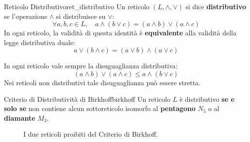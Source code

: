 \begin{definizione}{Reticolo Distributivo}{ret_distributivo}
Un reticolo $(L, \wedge, \vee)$ si dice \textbf{distributivo} se l'operazione $\wedge$ si distribuisce su $\vee$:
\[
    \forall a, b, c \in L, \quad a \wedge (b \vee c) = (a \wedge b) \vee (a \wedge c)
\]
In ogni reticolo, la validità di questa identità è \textbf{equivalente} alla validità della legge distributiva duale:
\[
    a \vee (b \wedge c) = (a \vee b) \wedge (a \vee c)
\]
\end{definizione}

In ogni reticolo vale sempre la disuguaglianza distributiva:
\[
    (a \wedge b) \vee (a \wedge c) \le a \wedge (b \vee c)
\]
Nei reticoli non distributivi tale disuguaglianza può essere stretta.

\begin{teorema}{Criterio di Distributività di Birkhoff}{birkhoff}
Un reticolo $L$ è distributivo \textbf{se e solo se} non contiene alcun sottoreticolo isomorfo al \textbf{pentagono} $N_5$ o al \textbf{diamante} $M_3$.
\end{teorema}

\begin{figure}[htbp]
\centering
\begin{minipage}{0.45\textwidth}
\centering
{}
\caption*{Pentagono $N_5$ (Non modulare)}
\end{minipage}
\hfill
\begin{minipage}{0.45\textwidth}
\centering
{}
\caption*{Diamante $M_3$ (Modulare non distributivo)}
\end{minipage}
\caption{I due reticoli proibiti del Criterio di Birkhoff.}
\label{fig:n5_m3}
\end{figure}

